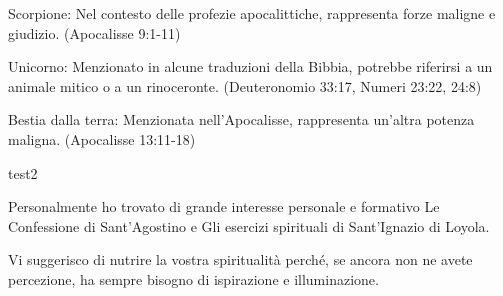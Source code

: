 \documentclass[a4paper,twoside,openany]{book}
\begin{document}
Scorpione: Nel contesto delle profezie apocalittiche, rappresenta forze maligne e giudizio. (Apocalisse 9:1-11)

Unicorno: Menzionato in alcune traduzioni della Bibbia, potrebbe riferirsi a un animale mitico o a un rinoceronte. (Deuteronomio 33:17, Numeri 23:22, 24:8)

Bestia dalla terra: Menzionata nell'Apocalisse, rappresenta un'altra potenza maligna. (Apocalisse 13:11-18)

test2

\begin{narratore}

	Personalmente ho trovato di grande interesse personale e formativo Le Confessione di Sant'Agostino e Gli esercizi spirituali di Sant'Ignazio di Loyola.

	Vi suggerisco di nutrire la vostra spiritualità perché, se ancora non ne avete percezione, ha sempre bisogno di ispirazione e illuminazione.
\end{narratore}

{\small \printindex}
\end{document}
